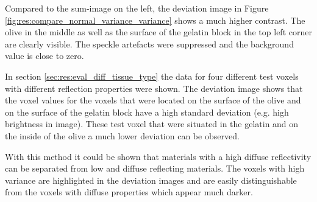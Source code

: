 Compared to the sum-image on the left, the deviation image in Figure \ref{fig:res:compare_normal_variance_variance} shows a much higher contrast. The olive in the middle as well as the surface of the gelatin block in the top left corner are clearly visible. The speckle artefacts were suppressed and the background value is close to zero. 


In section \ref{sec:res:eval_diff_tissue_type} the data for four different test voxels with different reflection properties were shown. The deviation image shows that the voxel values for the voxels that were located on the surface of the olive and on the surface of the gelatin block have a high standard deviation (e.g. high brightness in image). These test voxel that were situated in the gelatin and on the inside of the olive a much lower deviation can be observed. 

\bigskip

With this method it could be shown that materials with a high diffuse reflectivity can be separated from low and diffuse reflecting materials. The voxels with high variance are highlighted in the deviation images and are easily distinguishable from the voxels with diffuse properties which appear much darker. 


